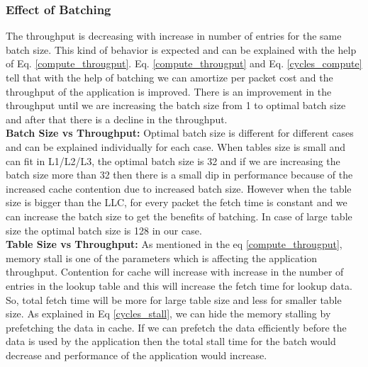 \subsubsection{Effect of Batching}
\label{batchingsubsection}
The throughput is decreasing with increase in number of entries for the same batch size. This kind of behavior is expected and can be explained with the help of Eq. \ref{compute_througput}. Eq. \ref{compute_througput} and Eq. \ref{cycles_compute} tell that with the help of batching we can amortize per packet cost and the throughput of the application is improved. There is an improvement in the throughput until we are increasing the batch size from 1 to optimal batch size and after that there is a decline in the throughput.
\\
\textbf{Batch Size vs Throughput:} Optimal batch size is different for different cases and can be explained individually for each case. When tables size is small and can fit in L1/L2/L3, the optimal batch size is 32 and if we are increasing the batch size more than 32 then there is a small dip in performance because of the increased cache contention due to increased batch size. However when the table size is bigger than the LLC, for every packet the fetch time is constant and we can increase the batch size to get the benefits of batching. In case of large table size the optimal batch size is 128 in our case.
\\
\textbf{Table Size vs Throughput:} As mentioned in the eq \ref{compute_througput}, memory stall is one of the parameters which is affecting the application throughput. Contention for cache will increase with increase in the number of entries in the lookup table and this will increase the fetch time for lookup data. So, total fetch time will be more for large table size and less for smaller table size. As explained in Eq \ref{cycles_stall}, we can hide the memory stalling by prefetching the data in cache. If we can prefetch the data efficiently before the data is used by the application then the total stall time for the batch would decrease and performance of the application would increase.

